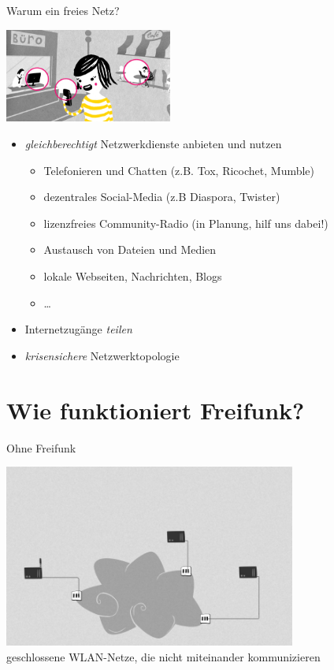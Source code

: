 \documentclass[10pt]{beamer}
\begin{document}
    \begin{frame}{Warum ein freies Netz?}
      \vfill
      \begin{center}
        \includegraphics[width=5.5cm]{images/verbindet}
      \end{center}

      \begin{itemize}[<+->]
        \item \emph{gleichberechtigt} Netzwerkdienste anbieten und nutzen
        \begin{itemize}
          \item Telefonieren und Chatten (z.B. Tox, Ricochet, Mumble)
          \item dezentrales Social-Media (z.B Diaspora, Twister)
          \item lizenzfreies Community-Radio (in Planung, hilf uns dabei!)
          \item Austausch von Dateien und Medien
          \item lokale Webseiten, Nachrichten, Blogs
          \item \ldots
        \end{itemize}
        \item Internetzugänge \emph{teilen}
        \item \emph{krisensichere} Netzwerktopologie
      \end{itemize}
      \vfill
    \end{frame}

  \section{Wie funktioniert Freifunk?}

    \begin{frame}{Ohne Freifunk}
      \begin{center}
        \includegraphics[height=6cm]{images/network_1}\\
        \vspace{1em}
        geschlossene WLAN-Netze, die nicht miteinander kommunizieren
        \vspace{1em}
      \end{center}
    \end{frame}
\end{document}
